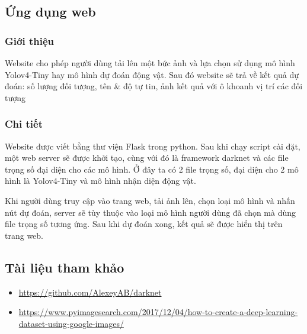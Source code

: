 \documentclass[20pt, a4paper]{article}
\begin{document}
\subsection{Ứng dụng web}
\subsubsection{Giới thiệu}
Website cho phép người dùng tải lên một bức ảnh và lựa chọn sử dụng mô hình Yolov4-Tiny hay mô hình dự đoán động vật. 
Sau đó website sẽ trả về kết quả dự đoán: số lượng đối tượng, tên \& độ tự tin, ảnh kết quả với ô khoanh vị trí các đối tượng

\subsubsection{Chi tiết}
Website được viết bằng thư viện Flask trong python. Sau khi chạy script cài đặt, một web server sẽ được khởi tạo, cùng với đó là framework darknet và các file trọng số đại diện cho các mô hình. 
Ở đây ta có 2 file trọng số, đại diện cho 2 mô hình là Yolov4-Tiny và mô hình nhận diện động vật.

Khi người dùng truy cập vào trang web, tải ảnh lên, chọn loại mô hình và nhấn nút dự đoán, 
server sẽ tùy thuộc vào loại mô hình người dùng đã chọn mà dùng file trọng số tương ứng. Sau khi dự đoán xong, kết quả sẽ được hiển thị trên trang web. 
\subsection{Tài liệu tham khảo}
\begin{itemize}
	\item \url{https://github.com/AlexeyAB/darknet}
	\item \url{https://www.pyimagesearch.com/2017/12/04/how-to-create-a-deep-learning-dataset-using-google-images/}
\end{itemize}
\end{document}
